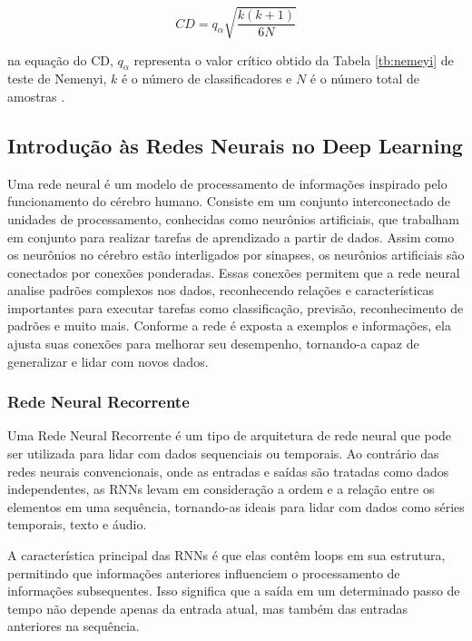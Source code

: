 \begin{equation}
	CD = q_\alpha \sqrt{\frac{k(k+1)}{6N}}
\end{equation}

\noindent na equação do CD, $q_\alpha$ representa o valor crítico obtido da Tabela \ref{tb:nemeyi} de teste de Nemenyi, $k$ é o número de classificadores e $N$ é o número total de amostras \cite{Liu2022}.

\subsection{Introdu\c c\~ao \`as Redes Neurais no Deep Learning}

Uma rede neural é um modelo de processamento de informações inspirado pelo funcionamento do cérebro humano. Consiste em um conjunto interconectado de unidades de processamento, conhecidas como neurônios artificiais, que trabalham em conjunto para realizar tarefas de aprendizado a partir de dados. Assim como os neurônios no cérebro estão interligados por sinapses, os neurônios artificiais são conectados por conexões ponderadas. Essas conexões permitem que a rede neural analise padrões complexos nos dados, reconhecendo relações e características importantes para executar tarefas como classificação, previsão, reconhecimento de padrões e muito mais. Conforme a rede é exposta a exemplos e informações, ela ajusta suas conexões para melhorar seu desempenho, tornando-a capaz de generalizar e lidar com novos dados.

\subsubsection{Rede Neural Recorrente}


Uma Rede Neural Recorrente é um tipo de arquitetura de rede neural que pode ser utilizada para lidar com dados sequenciais ou temporais. Ao contrário das redes neurais convencionais, onde as entradas e saídas são tratadas como dados independentes, as RNNs levam em consideração a ordem e a relação entre os elementos em uma sequência, tornando-as ideais para lidar com dados como séries temporais, texto e áudio.

A característica principal das RNNs é que elas contêm loops em sua estrutura, permitindo que informações anteriores influenciem o processamento de informações subsequentes. Isso significa que a saída em um determinado passo de tempo não depende apenas da entrada atual, mas também das entradas anteriores na sequência.


